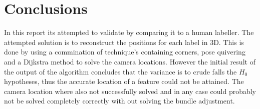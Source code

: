 \section{Conclusions}
\label{sec:conclusion}
In this report its attempted to validate \openposeS by comparing it to a human labeller.
The attempted solution is to reconstruct the positions for each label in 3D.
This is done by using a commination of technique's containing \arucoS corners, pose quivering and a Dijkstra method to solve the camera locations.
However the initial result of the output of the \openposS algorithm concludes that the variance is to crude falls the $H_0$ hypotheses, thus the accurate location of a feature could not be attained.
The camera location where also not successfully solved and in any case could probably not be solved completely correctly with out solving the bundle adjustment.



